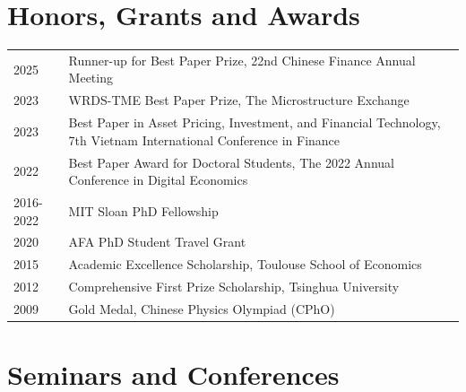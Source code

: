 \documentclass[11pt]{article}
\begin{document}
\section*{Honors, Grants and Awards}
\label{awards}

\begin{longtable}[l]{@{}p{} p{}}
    2025 & Runner-up for Best Paper Prize, 22nd Chinese Finance Annual Meeting \\
    2023 & WRDS-TME Best Paper Prize, The Microstructure Exchange \\
    2023 & Best Paper in Asset Pricing, Investment, and Financial Technology, 7th Vietnam International Conference in Finance \\
    2022 & Best Paper Award for Doctoral Students, The 2022 Annual Conference in Digital Economics \\
    2016-2022 & MIT Sloan PhD Fellowship \\
    2020 & AFA PhD Student Travel Grant \\
    2015 & Academic Excellence Scholarship, Toulouse School of Economics \\
    2012 & Comprehensive First Prize Scholarship, Tsinghua University\\
    2009 & Gold Medal, Chinese Physics Olympiad (CPhO)\\
\end{longtable}


\section*{Seminars and Conferences}
\label{seminar}
\end{document}
